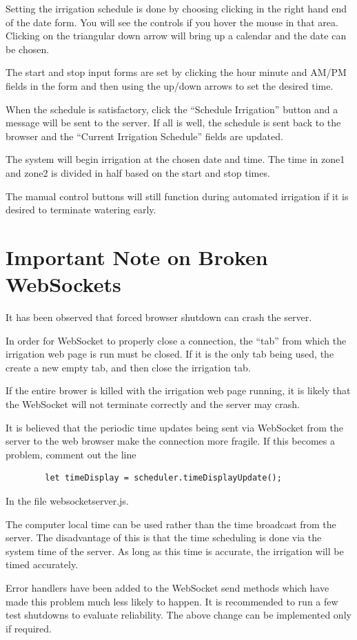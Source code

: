 Setting the irrigation schedule is done by choosing clicking in the right hand 
end of the date form.  You will see the controls if you hover the mouse in that 
area.  Clicking on the triangular down arrow will bring up a calendar and the 
date can be chosen.

The start and stop input forms are set by clicking the hour minute and AM/PM 
fields in the form and then using the up/down arrows to set the desired time.

When the schedule is satisfactory, click the ``Schedule Irrigation'' button and 
a message will be sent to the server.  If all is well, the schedule is sent 
back to the browser and the ``Current Irrigation Schedule'' fields are updated.

The system will begin irrigation at the chosen date and time.  The time in 
zone1 and zone2 is divided in half based on the start and stop times.

The manual control buttons will still function during automated irrigation if 
it is desired to terminate watering early.

\section{Important Note on Broken WebSockets}

It has been observed that forced browser shutdown can crash the server.

In order for WebSocket to properly close a connection, the ``tab'' from
which the irrigation web page is run must be closed.  If it is the only tab being used,
the create a new empty tab, and then close the irrigation tab.

If the entire brower is killed with the irrigation web page running, it is likely
that the WebSocket will not terminate correctly and the server may crash.

It is believed that the periodic
time updates being sent via WebSocket from the server to the web browser make the
connection more fragile.  If this becomes a problem, comment out the line

\begin{verbatim}
        let timeDisplay = scheduler.timeDisplayUpdate();
\end{verbatim}

In the file websocketserver.js.

The computer local time can be used rather than the time broadcast from the server.
The disadvantage of this is that the time scheduling is done via the system time
of the server.  As long as this time is accurate, the irrigation will be timed accurately.

Error handlers have been added to the WebSocket send methods which have made this problem much less
likely to happen.  It is recommended to run a few test shutdowns to evaluate reliability.  The above change
can be implemented only if required.








 
